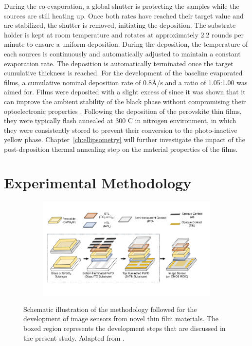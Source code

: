 During the co-evaporation, a global shutter is protecting the samples while the sources are still heating up. Once both rates have reached their target value and are stabilized, the shutter is removed, initiating the deposition. The substrate holder is kept at room temperature and rotates at approximately 2.2 rounds per minute to ensure a uniform deposition. During the deposition, the temperature of each sources is continuously and automatically adjusted to maintain a constant evaporation rate. The deposition is automatically terminated once the target cumulative thickness is reached. For the development of the baseline evaporated films, a cumulative nominal deposition rate of 0.8{\AA}/s and a  ratio of 1.05:1.00 was aimed for. Films were deposited with a slight excess of  since it was shown that it can improve the ambient stability of the black phase without compromising their optoelectronic properties \cite{Ma2017TheCells}. Following the deposition of the perovskite thin films, they were typically flash annealed at 300 \degree C in nitrogen environment, in which they were consistently stored to prevent their conversion to the photo-inactive yellow phase. Chapter~\ref{ch:ellipsometry} will further investigate the impact of the post-deposition thermal annealing step on the material properties of the  films.


\section{Experimental Methodology}

\begin{figure}[htbp]
    \centering
    \begin{subfigure}[t]{0.99\textwidth} %
        \centering
        \includegraphics[width=\textwidth]{chapters/material_properties/images/methodology.pdf} %
    \end{subfigure}

    \caption{Schematic illustration of the methodology followed for the development of image sensors from novel thin film materials. The boxed region represents the development steps that are discussed in the present study. Adapted from \cite{Malinowski2023ImageAbsorbers}.}
    \label{fig:ch2:methodology}
\end{figure}

